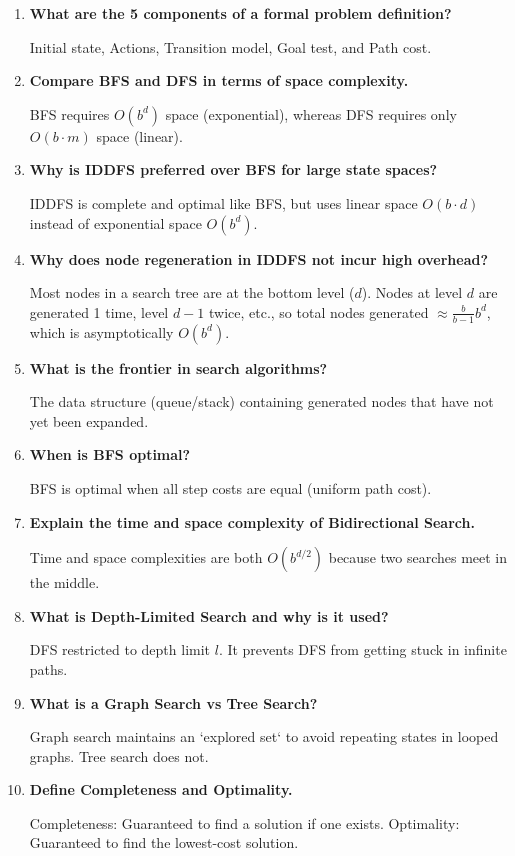 \documentclass[12pt,a4paper]{article}
\newcommand{\Q}[1]{\textbf{#1}\par\noindent\ignorespaces}
\begin{document}
\begin{tcolorbox}[exambox, title={\textbf{Frequently Asked / Viva Questions}}]
  \begin{enumerate}[topsep=0pt, label=\textbf{Q\arabic*.}, itemsep=5pt]
    \item \Q{What are the 5 components of a formal problem definition?}
    Initial state, Actions, Transition model, Goal test, and Path cost.

    \item \Q{Compare BFS and DFS in terms of space complexity.}
    BFS requires $O(b^d)$ space (exponential), whereas DFS requires only $O(b \cdot m)$ space (linear).

    \item \Q{Why is IDDFS preferred over BFS for large state spaces?}
    IDDFS is complete and optimal like BFS, but uses linear space $O(b \cdot d)$ instead of exponential space $O(b^d)$.

    \item \Q{Why does node regeneration in IDDFS not incur high overhead?}
    Most nodes in a search tree are at the bottom level ($d$). Nodes at level $d$ are generated 1 time, level $d-1$ twice, etc., so total nodes generated $\approx \frac{b}{b-1} b^d$, which is asymptotically $O(b^d)$.

    \item \Q{What is the frontier in search algorithms?}
    The data structure (queue/stack) containing generated nodes that have not yet been expanded.

    \item \Q{When is BFS optimal?}
    BFS is optimal when all step costs are equal (uniform path cost).

    \item \Q{Explain the time and space complexity of Bidirectional Search.}
    Time and space complexities are both $O(b^{d/2})$ because two searches meet in the middle.

    \item \Q{What is Depth-Limited Search and why is it used?}
    DFS restricted to depth limit $l$. It prevents DFS from getting stuck in infinite paths.

    \item \Q{What is a Graph Search vs Tree Search?}
    Graph search maintains an `explored set` to avoid repeating states in looped graphs. Tree search does not.

    \item \Q{Define Completeness and Optimality.}
    Completeness: Guaranteed to find a solution if one exists. Optimality: Guaranteed to find the lowest-cost solution.
  \end{enumerate}
\end{tcolorbox}
\end{document}
